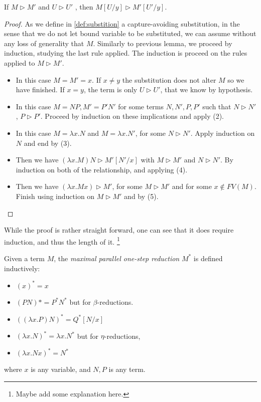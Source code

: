 \begin{lemma}If $M \triangleright M'$ and $U \triangleright U'$ , then $M [U/y] \triangleright M' [U' /y]$.
\end{lemma}
\begin{proof}
  As we define in \ref{def:substition} a capture-avoiding substitution, in the sense that we do not let bound variable to be substituted, we can assume without any loss of generality that $M$. Similarly to previous lemma, we proceed by induction, studying the last rule applied. The induction is proceed on the rules applied to $M\triangleright M'$.

  \begin{itemize}
  \item[(1)] In this case $M=M'=x$. If $x\ne y$ the substitution does not alter $M$ so we have finished. If $x = y$, the term is only $U\triangleright U'$, that we know by hypothesis.
  \item[(2)] In this case $M=NP, M'=P'N'$ for some terms $N,N',P,P'$ such that $N\triangleright N'$, $P\triangleright P'$. Proceed by induction on these implications and apply (2).
  \item[(3)] In this case $M=\lambda x.N$ and $M=\lambda x.N'$, for some $N\triangleright N'$. Apply induction on $N$ and end by (3).
  \item[(4)] Then we have $(\lambda x.M)N \triangleright M'[N'/x]$ with $M \triangleright M'$ and $N \triangleright N'$. By induction on both of the relationship, and applying (4).
  \item[(5)] Then we have $(\lambda x.Mx) \triangleright M'$, for some $M\triangleright M'$ and for some $x \not  \in FV(M)$. Finish using induction on $M\triangleright M'$ and by (5).
  \end{itemize}
\end{proof}

While the proof is rather straight forward, one can see that it does require induction, and thus the length of it. \footnote{Maybe add some explanation here.}

\begin{definition}
  Given a term $M$, the \emph{maximal parallel one-step reduction} $M^*$ is defined inductively:
  \begin{itemize}
  \item $(x)^*  =x$ 
  \item $(PN)*=P^*N^*$ but for $\beta$-reductions.
  \item $((\lambda x.P)N)^* = Q^*[N/x] $
  \item $(\lambda x.N)^*=\lambda x.N^*$ but for $\eta$-reductions, 
  \item $(\lambda x.Nx)^*=N^*$ 
  \end{itemize}
  where $x$ is any variable, and $N,P$ is any term.
\end{definition}


